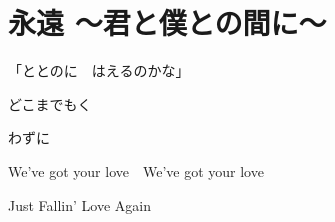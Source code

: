 \section{ 永遠 ～君と僕との間に～}
\large{

「ととのに　はえるのかな」

どこまでもく

わずに

We've got your love　We've got your love

Just Fallin' Love Again

}